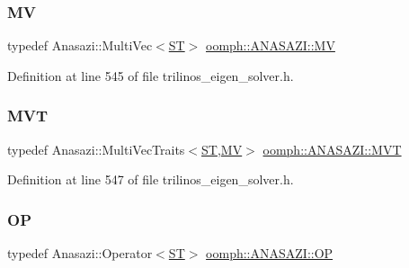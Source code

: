 \mbox{\label{classoomph_1_1ANASAZI_aa1922409eb193949b0cb4e89d43316ed}} 
\subsubsection{\texorpdfstring{MV}{MV}}
{\footnotesize\ttfamily typedef Anasazi\+::\+Multi\+Vec$<$\hyperlink{classoomph_1_1ANASAZI_a604b8dc6a0618d81dfce82849d5b47a7}{ST}$>$ \hyperlink{classoomph_1_1ANASAZI_aa1922409eb193949b0cb4e89d43316ed}{oomph\+::\+A\+N\+A\+S\+A\+Z\+I\+::\+MV}\hspace{0.3cm}{\ttfamily [private]}}



Definition at line 545 of file trilinos\+\_\+eigen\+\_\+solver.\+h.

\mbox{\label{classoomph_1_1ANASAZI_a7c667c5531aff020a4dbd95f0cebba8b}} 
\subsubsection{\texorpdfstring{M\+VT}{MVT}}
{\footnotesize\ttfamily typedef Anasazi\+::\+Multi\+Vec\+Traits$<$\hyperlink{classoomph_1_1ANASAZI_a604b8dc6a0618d81dfce82849d5b47a7}{ST},\hyperlink{classoomph_1_1ANASAZI_aa1922409eb193949b0cb4e89d43316ed}{MV}$>$ \hyperlink{classoomph_1_1ANASAZI_a7c667c5531aff020a4dbd95f0cebba8b}{oomph\+::\+A\+N\+A\+S\+A\+Z\+I\+::\+M\+VT}\hspace{0.3cm}{\ttfamily [private]}}



Definition at line 547 of file trilinos\+\_\+eigen\+\_\+solver.\+h.

\mbox{\label{classoomph_1_1ANASAZI_ac89159c0da5e64ce641a2bcb8bd2d2be}} 
\subsubsection{\texorpdfstring{OP}{OP}}
{\footnotesize\ttfamily typedef Anasazi\+::\+Operator$<$\hyperlink{classoomph_1_1ANASAZI_a604b8dc6a0618d81dfce82849d5b47a7}{ST}$>$ \hyperlink{classoomph_1_1ANASAZI_ac89159c0da5e64ce641a2bcb8bd2d2be}{oomph\+::\+A\+N\+A\+S\+A\+Z\+I\+::\+OP}\hspace{0.3cm}{\ttfamily [private]}}



